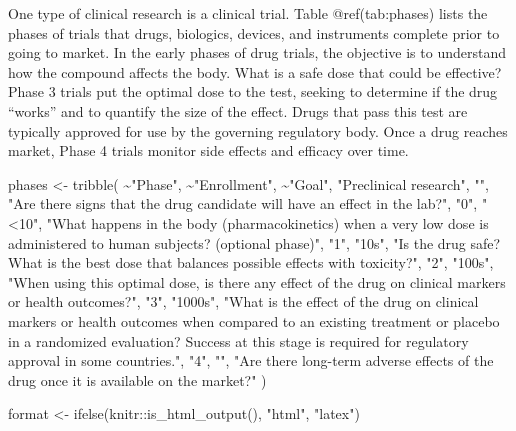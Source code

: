 \documentclass[
  letterpaper,
  DIV=11,
  numbers=noendperiod,
  oneside]{scrartcl}
\newenvironment{Shaded}{\begin{snugshade}}{\end{snugshade}}
\newcommand{\FunctionTok}[1]{\textcolor[rgb]{0.28,0.35,0.67}{#1}}
\newcommand{\NormalTok}[1]{\textcolor[rgb]{0.00,0.23,0.31}{#1}}
\newcommand{\OtherTok}[1]{\textcolor[rgb]{0.00,0.23,0.31}{#1}}
\newcommand{\SpecialCharTok}[1]{\textcolor[rgb]{0.37,0.37,0.37}{#1}}
\newcommand{\StringTok}[1]{\textcolor[rgb]{0.13,0.47,0.30}{#1}}
\begin{document}
One type of clinical research is a clinical trial. Table
@ref(tab:phases) lists the phases of trials that drugs, biologics,
devices, and instruments complete prior to going to market. In the early
phases of drug trials, the objective is to understand how the compound
affects the body. What is a safe dose that could be effective? Phase 3
trials put the optimal dose to the test, seeking to determine if the
drug ``works'' and to quantify the size of the effect. Drugs that pass
this test are typically approved for use by the governing regulatory
body. Once a drug reaches market, Phase 4 trials monitor side effects
and efficacy over time.

\vspace{1em}

\begin{Shaded}
\begin{Highlighting}[]
\NormalTok{phases }\OtherTok{\textless{}{-}} \FunctionTok{tribble}\NormalTok{(}
    \SpecialCharTok{\textasciitilde{}}\StringTok{"Phase"}\NormalTok{, }\SpecialCharTok{\textasciitilde{}}\StringTok{"Enrollment"}\NormalTok{, }\SpecialCharTok{\textasciitilde{}}\StringTok{"Goal"}\NormalTok{,}
  \StringTok{"Preclinical research"}\NormalTok{, }\StringTok{""}\NormalTok{, }\StringTok{"Are there signs that the drug candidate will have an effect in the lab?"}\NormalTok{,}
  \StringTok{"0"}\NormalTok{, }\StringTok{"\textless{}10"}\NormalTok{, }\StringTok{"What happens in the body (pharmacokinetics) when a very low dose is administered to human subjects? (optional phase)"}\NormalTok{,}
  \StringTok{"1"}\NormalTok{, }\StringTok{"10s"}\NormalTok{, }\StringTok{"Is the drug safe? What is the best dose that balances possible effects with toxicity?"}\NormalTok{,}
  \StringTok{"2"}\NormalTok{, }\StringTok{"100s"}\NormalTok{, }\StringTok{"When using this optimal dose, is there any effect of the drug on clinical markers or health outcomes?"}\NormalTok{,}
  \StringTok{"3"}\NormalTok{, }\StringTok{"1000s"}\NormalTok{, }\StringTok{"What is the effect of the drug on clinical markers or health outcomes when compared to an existing treatment or placebo in a randomized evaluation? Success at this stage is required for regulatory approval in some countries."}\NormalTok{,}
  \StringTok{"4"}\NormalTok{, }\StringTok{""}\NormalTok{, }\StringTok{"Are there long{-}term adverse effects of the drug once it is available on the market?"}
\NormalTok{)  }
  
\NormalTok{format }\OtherTok{\textless{}{-}} \FunctionTok{ifelse}\NormalTok{(knitr}\SpecialCharTok{::}\FunctionTok{is\_html\_output}\NormalTok{(), }\StringTok{"html"}\NormalTok{, }\StringTok{"latex"}\NormalTok{)}


\end{Highlighting}
\end{Shaded}
\end{document}
